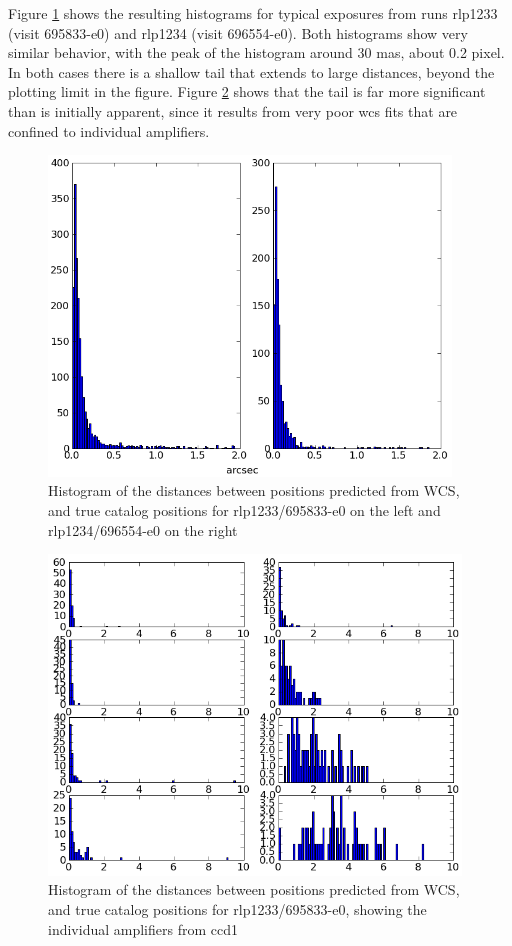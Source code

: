 Figure \ref{fig:wcs1} shows the resulting histograms for typical
exposures from runs rlp1233 (visit 695833-e0) and rlp1234 (visit
696554-e0). Both histograms show very similar behavior, with the peak
of the histogram around 30 mas, about 0.2 pixel.  In both cases there
is a shallow tail that extends to large distances, beyond the plotting
limit in the figure.  Figure \ref{fig:wcs2} shows that the tail is
far more significant than is initially apparent, since it
results from very poor wcs fits that are confined to individual
amplifiers.

\begin{figure}[p]
\begin{center}
\includegraphics[height=3.35in]{images/rlp1233_1234_match.png}
\caption{Histogram of the distances between positions predicted from WCS, and
  true catalog positions for rlp1233/695833-e0 on the left and
  rlp1234/696554-e0 on the right}  
\label{fig:wcs1}
\end{center}
\end{figure}

\begin{figure}[p]
\begin{center}
\includegraphics[height=3.35in]{images/rlp1233_ccd1_match.png}
\caption{Histogram of the distances between positions predicted from WCS, and
  true catalog positions for rlp1233/695833-e0, showing the individual
amplifiers from ccd1}  
\label{fig:wcs2}
\end{center}
\end{figure}

